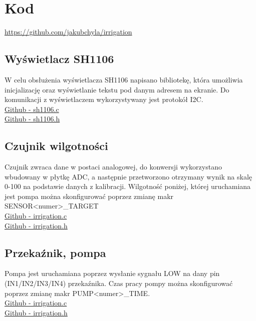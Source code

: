 \documentclass{article}
\begin{document}
\section{Kod}
\href{https://github.com/jakubchyla/irrigation}{https://github.com/jakubchyla/irrigation}
\subsection{Wyświetlacz SH1106}
\begin{flushleft}
    W celu obsłużenia wyświetlacza SH1106 napisano bibliotekę, która umożliwia inicjalizację oraz wyświetlanie tekstu pod danym adresem na ekranie.
    Do komunikacji z wyświetlaczem wykorzystywany jest protokół I2C.\\
    \vspace{7pt}
    \href{https://github.com/jakubchyla/irrigation/blob/master/Core/Src/sh1106.c}{Github - sh1106.c}\\
    \href{https://github.com/jakubchyla/irrigation/blob/master/Core/Inc/sh1106.h}{Github - sh1106.h}

\end{flushleft}
\subsection{Czujnik wilgotności}
\begin{flushleft}
    Czujnik zwraca dane w postaci analogowej, do konwersji wykorzystano wbudowany w płytkę ADC, a następnie przetworzono otrzymany wynik
    na skalę 0-100 na podstawie danych z kalibracji. Wilgotność poniżej, której uruchamiana jest pompa można skonfigurować poprzez
    zmianę makr SENSOR<numer>\_TARGET\\
    \vspace{7pt}
    \href{https://github.com/jakubchyla/irrigation/blob/master/Core/Src/irrigation.c}{Github - irrigation.c}\\
    \href{https://github.com/jakubchyla/irrigation/blob/master/Core/Inc/irrigation.h}{Github - irrigation.h}
\end{flushleft}

\subsection{Przekaźnik, pompa}
\begin{flushleft}
    Pompa jest uruchamiana poprzez wysłanie sygnału LOW na dany pin (IN1/IN2/IN3/IN4) przekaźnika.
    Czas pracy pompy można skonfigurować poprzez zmianę makr PUMP<numer>\_TIME.\\
    \vspace{7pt}
    \href{https://github.com/jakubchyla/irrigation/blob/master/Core/Src/irrigation.c}{Github - irrigation.c}\\
    \href{https://github.com/jakubchyla/irrigation/blob/master/Core/Inc/irrigation.h}{Github - irrigation.h}
\end{flushleft}
\end{document}
